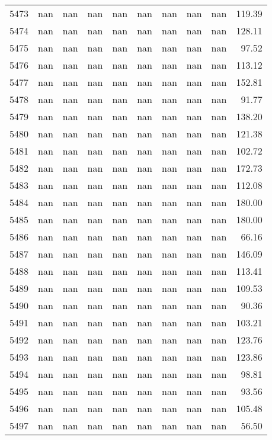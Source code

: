 \begin{tabular}{lrrrrrrrrr}
5473 & nan & nan & nan & nan & nan & nan & nan & nan & 119.39 \\
5474 & nan & nan & nan & nan & nan & nan & nan & nan & 128.11 \\
5475 & nan & nan & nan & nan & nan & nan & nan & nan & 97.52 \\
5476 & nan & nan & nan & nan & nan & nan & nan & nan & 113.12 \\
5477 & nan & nan & nan & nan & nan & nan & nan & nan & 152.81 \\
5478 & nan & nan & nan & nan & nan & nan & nan & nan & 91.77 \\
5479 & nan & nan & nan & nan & nan & nan & nan & nan & 138.20 \\
5480 & nan & nan & nan & nan & nan & nan & nan & nan & 121.38 \\
5481 & nan & nan & nan & nan & nan & nan & nan & nan & 102.72 \\
5482 & nan & nan & nan & nan & nan & nan & nan & nan & 172.73 \\
5483 & nan & nan & nan & nan & nan & nan & nan & nan & 112.08 \\
5484 & nan & nan & nan & nan & nan & nan & nan & nan & 180.00 \\
5485 & nan & nan & nan & nan & nan & nan & nan & nan & 180.00 \\
5486 & nan & nan & nan & nan & nan & nan & nan & nan & 66.16 \\
5487 & nan & nan & nan & nan & nan & nan & nan & nan & 146.09 \\
5488 & nan & nan & nan & nan & nan & nan & nan & nan & 113.41 \\
5489 & nan & nan & nan & nan & nan & nan & nan & nan & 109.53 \\
5490 & nan & nan & nan & nan & nan & nan & nan & nan & 90.36 \\
5491 & nan & nan & nan & nan & nan & nan & nan & nan & 103.21 \\
5492 & nan & nan & nan & nan & nan & nan & nan & nan & 123.76 \\
5493 & nan & nan & nan & nan & nan & nan & nan & nan & 123.86 \\
5494 & nan & nan & nan & nan & nan & nan & nan & nan & 98.81 \\
5495 & nan & nan & nan & nan & nan & nan & nan & nan & 93.56 \\
5496 & nan & nan & nan & nan & nan & nan & nan & nan & 105.48 \\
5497 & nan & nan & nan & nan & nan & nan & nan & nan & 56.50 \\

\end{tabular}
